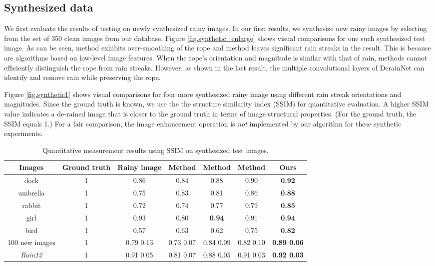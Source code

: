 \documentclass[journal]{IEEEtran}
\begin{document}
\subsection{Synthesized data}
We first evaluate the results of testing on newly synthesized rainy images. In our first results, we synthesize new rainy images by selecting from the set of 350 clean images from our database. Figure \ref{fig.synthetic_enlarge}  shows visual comparisons for one such synthesized test image. As can be seen, method \cite{13} exhibits over-smoothing of the rope and method \cite{16,34} leaves significant rain streaks in the result. This is because \cite{13,16,34} are algorithms based on low-level image features. When the rope's orientation and magnitude is similar with that of rain, methods \cite{13,16,34} cannot efficiently distinguish the rope from rain streaks. However, as shown in the last result, the multiple convolutional layers of DerainNet can identify and remove rain while preserving the rope.

Figure \ref{fig.synthetic1}  shows visual comparisons for four more synthesized rainy image using different rain streak orientations and magnitudes. Since the ground truth is known, we use the the structure similarity index (SSIM) \cite{30} for quantitative evaluation. A higher SSIM value indicates a de-rained image that is closer to the ground truth in terms of image structural properties. (For the ground truth, the SSIM equals 1.) For a fair comparison, the image enhancement operation is \textit{not} implemented by our algorithm for these synthetic experiments.
\begin{table*}
\caption{Quantitative measurement results using SSIM on synthesized test images.}
\label{tab.SSIM}
\centering
\begin{tabular}{|c|c|c|c|c|c|c|}
\hline
Images &Ground truth &Rainy image& Method \cite{13} & Method \cite{16} & Method \cite{34} &Ours\\
\hline
dock&1&  0.86 & 0.84 &   0.88  & 0.90 & \textbf{0.92}\\
\hline
umbrella&1& 0.75 &0.83 &   0.81 &0.86 &\textbf{0.88}\\
\hline
rabbit&1& 0.72 &0.74  &  0.77  &  0.79&\textbf{0.85}\\
\hline
girl&1& 0.93&0.80  &  \textbf{0.94}  & 0.91 &\textbf{0.94}\\
\hline
bird&1& 0.57&0.63  &  0.62  & 0.75 &\textbf{0.82}\\
\hline
100 new images&1 & 0.79  0.13  & 0.73  0.07  &  0.84  0.09 & 0.82  0.10  & \textbf{0.89  0.06}\\
\hline
\emph{Rain12} \cite{34}&1 & 0.91  0.05  & 0.81  0.07  &  0.88  0.05 & 0.91  0.03 & \textbf{0.92  0.03}\\
\hline
\end{tabular}
\end{table*}
\end{document}
